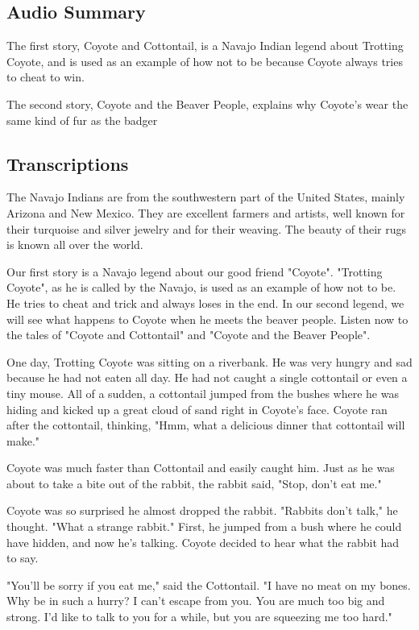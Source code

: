 \subsection{Audio Summary}

The first story, Coyote and Cottontail, is a Navajo Indian legend about Trotting Coyote, and is used as an example of how not to be because Coyote always tries to cheat to win.

The second story, Coyote and the Beaver People, explains why Coyote's wear the same kind of fur as the badger

\subsection{Transcriptions}

The Navajo Indians are from the southwestern part of the United States, mainly Arizona and New Mexico. They are excellent farmers and artists, well known for their turquoise and silver jewelry and for their weaving. The beauty of their rugs is known all over the world.

Our first story is a Navajo legend about our good friend "Coyote". "Trotting Coyote", as he is called by the Navajo, is used as an example of how not to be. He tries to cheat and trick and always loses in the end. In our second legend, we will see what happens to Coyote when he meets the beaver people. Listen now to the tales of "Coyote and Cottontail" and "Coyote and the Beaver People".

One day, Trotting Coyote was sitting on a riverbank. He was very hungry and sad because he had not eaten all day. He had not caught a single cottontail or even a tiny mouse. All of a sudden, a cottontail jumped from the bushes where he was hiding and kicked up a great cloud of sand right in Coyote's face. Coyote ran after the cottontail, thinking, "Hmm, what a delicious dinner that cottontail will make."

Coyote was much faster than Cottontail and easily caught him. Just as he was about to take a bite out of the rabbit, the rabbit said, "Stop, don't eat me."

Coyote was so surprised he almost dropped the rabbit. "Rabbits don't talk," he thought. "What a strange rabbit." First, he jumped from a bush where he could have hidden, and now he's talking. Coyote decided to hear what the rabbit had to say.

"You'll be sorry if you eat me," said the Cottontail. "I have no meat on my bones. Why be in such a hurry? I can't escape from you. You are much too big and strong. I'd like to talk to you for a while, but you are squeezing me too hard."

